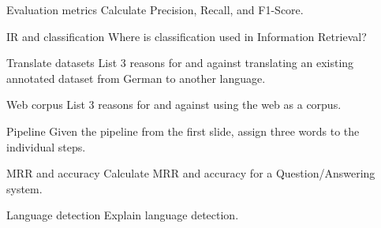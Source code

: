 \documentclass{article}
\begin{document}
\begin{exercise}{Evaluation metrics}
  Calculate Precision, Recall, and F1-Score.

  \begin{solution}
  \end{solution}
\end{exercise}

\begin{exercise}{IR and classification}
  Where is classification used in Information Retrieval?

  \begin{solution}
  \end{solution}
\end{exercise}

\begin{exercise}{Translate datasets}
  List 3 reasons for and against translating an existing annotated dataset from German to another language.

  \begin{solution}
  \end{solution}
\end{exercise}

\begin{exercise}{Web corpus}
  List 3 reasons for and against using the web as a corpus.

  \begin{solution}
  \end{solution}
\end{exercise}

\begin{exercise}{Pipeline}
  Given the pipeline from the first slide, assign three words to the individual steps.

  \begin{solution}
  \end{solution}
\end{exercise}

\begin{exercise}{MRR and accuracy}
  Calculate MRR and accuracy for a Question/Answering system.

  \begin{solution}
  \end{solution}
\end{exercise}

\begin{exercise}{Language detection}
  Explain language detection.

  \begin{solution}
  \end{solution}
\end{exercise}
\end{document}
